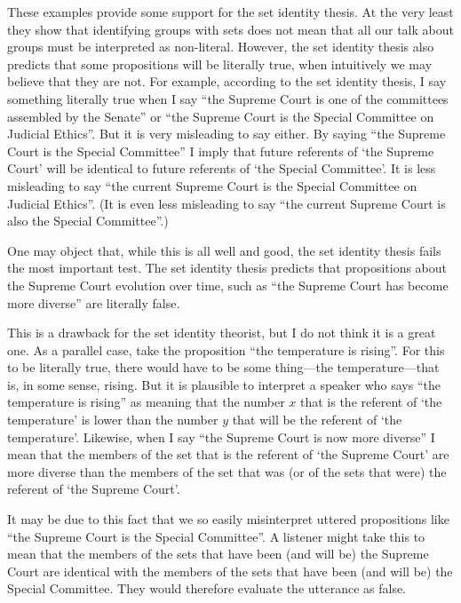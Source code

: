 \documentclass[11pt]{article}
\begin{document}
\begin{spacing}{1.5}
These examples provide some support for the set identity thesis.  At
the very least they show that identifying groups with sets does not
mean that all our talk about groups must be interpreted as
non-literal.  However, the set identity thesis also predicts that some
propositions will be literally true, when intuitively we may believe
that they are not.  For example, according to the set identity thesis,
I say something literally true when I say ``the Supreme Court is one
of the committees assembled by the Senate'' or ``the Supreme Court is
the Special Committee on Judicial Ethics''.  But it is very misleading
to say either.  By saying ``the Supreme Court is the Special
Committee'' I imply that future referents of `the Supreme Court' will
be identical to future referents of `the Special Committee'.  It is
less misleading to say ``the current Supreme Court is the Special
Committee on Judicial Ethics''.  (It is even less misleading to say
``the current Supreme Court is also the Special Committee''.)

One may object that, while this is all well and good, the set identity
thesis fails the most important test.  The set identity thesis
predicts that propositions about the Supreme Court evolution over
time, such as ``the Supreme Court has become more diverse'' are
literally false.

This is a drawback for the set identity theorist, but I do not think
it is a great one.  As a parallel case, take the proposition ``the
temperature is rising''.  For this to be literally true, there would
have to be some thing---the temperature---that is, in some sense,
rising.  But it is plausible to interpret a speaker who says ``the
temperature is rising'' as meaning that the number $x$ that is the
referent of `the temperature' is lower than the number $y$ that will
be the referent of `the temperature'.  Likewise, when I say ``the
Supreme Court is now more diverse'' I mean that the members of the set
that is the referent of `the Supreme Court' are more diverse than the
members of the set that was (or of the sets that were) the referent of
`the Supreme Court'.

It may be due to this fact that we so easily misinterpret uttered
propositions like ``the Supreme Court is the Special Committee''.  A
listener might take this to mean that the members of the sets that
have been (and will be) the Supreme Court are identical with the
members of the sets that have been (and will be) the Special
Committee.  They would therefore evaluate the utterance as false.


\end{spacing}
\end{document}

